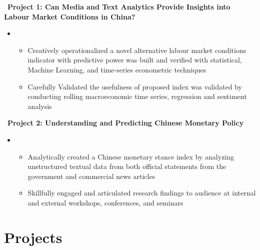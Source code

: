 \documentclass[12pt,a4paper,roman]{moderncv}        %
\begin{document}
\smallskip
\faBook \, \textbf{Project 1: Can Media and Text Analytics Provide Insights into Labour Market Conditions in China?}
\begin{itemize}
    \item[]\begin{itemize}
        \item Creatively operationalized a novel alternative labour market conditions indicator with predictive power was built and verified with statistical, Machine Learning, and time-series econometric techniques
        \item Carefully Validated the usefulness of proposed index was validated by conducting rolling macroeconomic time series, regression and sentiment analysis
    \end{itemize}
\end{itemize}
\smallskip
\faBook \, \textbf{Project 2: Understanding and Predicting Chinese Monetary Policy}
\begin{itemize}
    \item[]\begin{itemize}
        \item Analytically created a Chinese monetary stance index by analyzing unstructured textual data from both official statements from the government and commercial news articles
        \item Skillfully engaged and articulated research findings to audience at internal and external workshops, conferences, and seminars
    \end{itemize}
\end{itemize}



\nocite{*}






\section{Projects}
\end{document}
